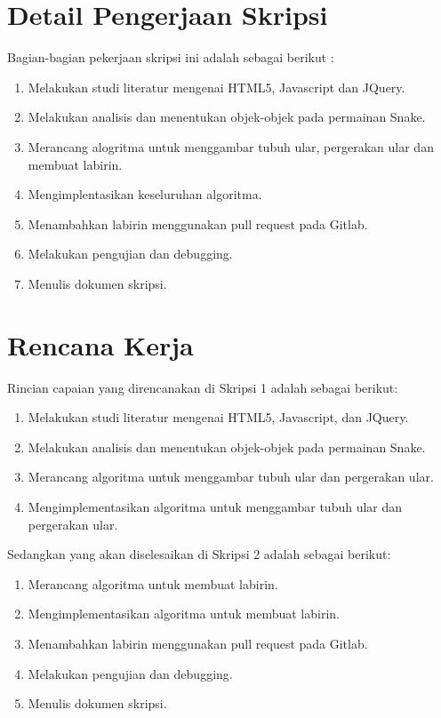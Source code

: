 \documentclass[a4paper,twoside]{article}
\begin{document}
\section{Detail Pengerjaan Skripsi}
Bagian-bagian pekerjaan skripsi ini adalah sebagai berikut :
	\begin{enumerate}
		\item Melakukan studi literatur mengenai HTML5, Javascript dan JQuery.
		\item Melakukan analisis dan menentukan objek-objek pada permainan Snake.
		\item Merancang alogritma untuk menggambar tubuh ular, pergerakan ular dan membuat labirin.
		\item Mengimplentasikan keseluruhan algoritma.
		\item Menambahkan labirin menggunakan pull request pada Gitlab.
		\item Melakukan pengujian dan debugging.
		\item Menulis dokumen skripsi.
	\end{enumerate}

\section{Rencana Kerja}
Rincian capaian yang direncanakan di Skripsi 1 adalah sebagai berikut:
\begin{enumerate}
\item Melakukan studi literatur mengenai HTML5, Javascript, dan JQuery.
\item Melakukan analisis dan menentukan objek-objek pada permainan Snake.
\item Merancang algoritma untuk menggambar tubuh ular dan pergerakan ular.
\item Mengimplementasikan algoritma untuk menggambar tubuh ular dan pergerakan ular.
\end{enumerate}

Sedangkan yang akan diselesaikan di Skripsi 2 adalah sebagai berikut:
\begin{enumerate}
\item Merancang algoritma untuk membuat labirin. 
\item Mengimplementasikan algoritma untuk membuat labirin.
\item Menambahkan labirin menggunakan pull request pada Gitlab.
\item Melakukan pengujian dan debugging.
\item Menulis dokumen skripsi.
\end{enumerate}
\end{document}
